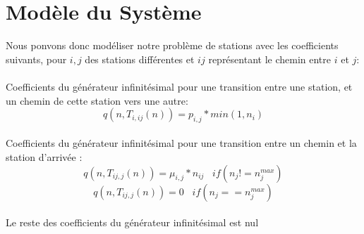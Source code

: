 \documentclass[12pt,a4paper]{article}
\begin{document}
\section{Modèle du Système}

Nous ponvons donc modéliser notre problème de stations avec les coefficients suivants, pour $i,j$ des stations différentes et $ij$ représentant le chemin entre $i$ et $j$:

\paragraph*{}
Coefficients du générateur infinitésimal pour une transition entre une station, et un chemin de cette station vers une autre:
$$
q(n, T_{i,ij} (n)) = p_{i,j} * min(1,n_i)
$$

\paragraph*{}
Coefficients du générateur infinitésimal pour une transition entre un chemin et la station d'arrivée :
$$
q(n, T_{ij,j} (n)) = \mu_{i,j} * n_{ij} \;\;\; if(n_j != n^{max}_j)
$$
$$
q(n, T_{ij,j} (n)) = 0 \;\;\; if(n_j == n^{max}_j)
$$

\paragraph*{}
Le reste des coefficients du générateur infinitésimal est nul
\end{document}
